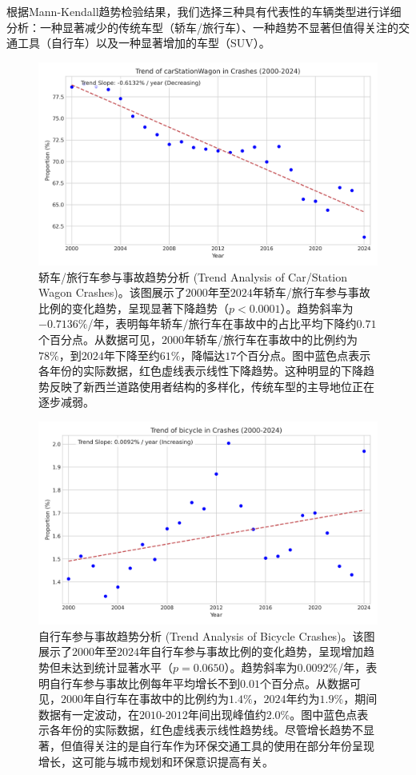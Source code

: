 \documentclass[12pt,a4paper]{article}
\begin{document}
根据Mann-Kendall趋势检验结果，我们选择三种具有代表性的车辆类型进行详细分析：一种显著减少的传统车型（轿车/旅行车）、一种趋势不显著但值得关注的交通工具（自行车）以及一种显著增加的车型（SUV）。

\begin{figure}[H]
\centering
\includegraphics[height=0.3\textheight]{trend_carStationWagon.png}
\caption{轿车/旅行车参与事故趋势分析 (Trend Analysis of Car/Station Wagon Crashes)。该图展示了$2000$年至$2024$年轿车/旅行车参与事故比例的变化趋势，呈现显著下降趋势（$p < 0.0001$）。趋势斜率为$-0.7136\%$/年，表明每年轿车/旅行车在事故中的占比平均下降约$0.71$个百分点。从数据可见，$2000$年轿车/旅行车在事故中的比例约为$78\%$，到$2024$年下降至约$61\%$，降幅达$17$个百分点。图中蓝色点表示各年份的实际数据，红色虚线表示线性下降趋势。这种明显的下降趋势反映了新西兰道路使用者结构的多样化，传统车型的主导地位正在逐步减弱。}
\label{fig:trend_carStationWagon}
\end{figure}

\begin{figure}[H]
\centering
\includegraphics[height=0.3\textheight]{trend_bicycle.png}
\caption{自行车参与事故趋势分析 (Trend Analysis of Bicycle Crashes)。该图展示了$2000$年至$2024$年自行车参与事故比例的变化趋势，呈现增加趋势但未达到统计显著水平（$p = 0.0650$）。趋势斜率为$0.0092\%$/年，表明自行车参与事故比例每年平均增长不到$0.01$个百分点。从数据可见，$2000$年自行车在事故中的比例约为$1.4\%$，$2024$年约为$1.9\%$，期间数据有一定波动，在$2010$-$2012$年间出现峰值约$2.0\%$。图中蓝色点表示各年份的实际数据，红色虚线表示线性趋势线。尽管增长趋势不显著，但值得关注的是自行车作为环保交通工具的使用在部分年份呈现增长，这可能与城市规划和环保意识提高有关。}
\label{fig:trend_bicycle}
\end{figure}
\end{document}
